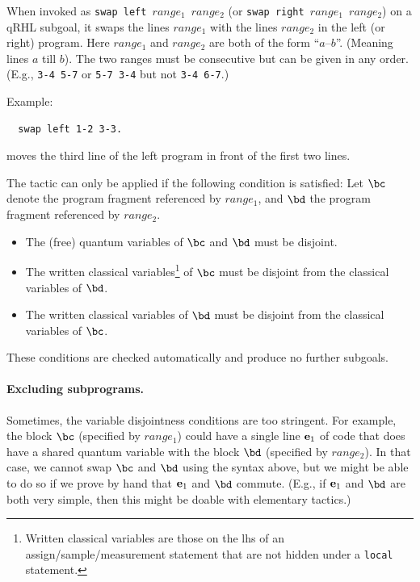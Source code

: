 \documentclass{article}
\begin{document}

When invoked as \texttt{swap left $\mathit{range_1}$ $\mathit{range_2}$} (or \texttt{swap
  right $\mathit{range_1}$ $\mathit{range_2}$}) on a qRHL subgoal, it swaps the lines $\mathit{range_1}$ with the lines $\mathit{range_2}$ in the left (or right) program.
Here $\mathit{range_1}$ and $\mathit{range_2}$ are both of the form ``$a$--$b$''.
(Meaning lines $a$ till $b$).
The two ranges must be consecutive but can be given in any order.
(E.g., \texttt{3-4 5-7} or \texttt{5-7 3-4} but not \texttt{3-4 6-7}.)

Example:
\begin{lstlisting}
  swap left 1-2 3-3.
\end{lstlisting}
moves the third line of the left program in front of the first two lines.

\medskip

The tactic can only be applied if the following condition is
satisfied:
Let $\bc$ denote the program fragment referenced by $\mathit{range_1}$, and $\bd$ the program fragment referenced by $\mathit{range_2}$.
\begin{itemize}
\item The (free) quantum variables of $\bc$ and $\bd$ must be disjoint.
\item The written classical variables\footnote{Written classical variables
    are those on the lhs of an assign/sample/measurement statement
    that are not hidden under a \texttt{local} statement.}
  of $\bc$ must be disjoint from the classical variables of $\bd$.
\item The written classical variables of $\bd$ must be disjoint from the classical variables of $\bc$.
\end{itemize}
These conditions are checked automatically and produce no further subgoals.

\medskip

\paragraph{Excluding subprograms.} Sometimes, the variable disjointness conditions are too stringent.
For example, the block $\bc$ (specified by $\mathit{range_1}$) could have a single line $\mathbf e_1$ of code that does have a shared quantum variable with the block $\bd$ (specified by $\mathit{range_2}$).
In that case, we cannot swap $\bc$ and $\bd$ using the syntax above, but we might be able to do so if we prove by hand that $\mathbf e_1$ and $\bd$ commute.
(E.g., if $\mathbf e_1$ and $\bd$ are both very simple, then this might be doable with elementary tactics.)
\end{document}
